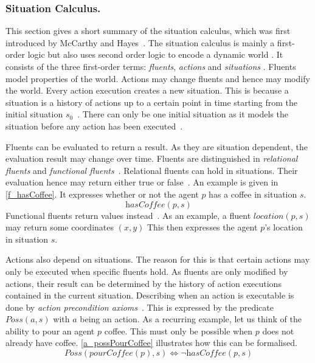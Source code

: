 \subsubsection{Situation Calculus.}\label{fun:apl_sitCalc}
This section gives a short summary of the situation calculus, which was first introduced by McCarthy and Hayes~\cite{mccarthy_philosophical_1969}. The situation calculus is mainly a first-order logic but also uses second order logic to encode a dynamic world \cite{levesque_golog:_1997}. %
It consists of the three first-order terms: \emph{fluents}, \emph{actions} and \emph{situations} \cite{mccarthy_philosophical_1969,boutilier_decision-theoretic_2000}. %
Fluents model properties of the world. Actions may change fluents and hence may modify the world. Every action execution creates a new situation. This is because a situation is a history of actions up to a certain point in time starting from the initial situation $s_0$~\cite{schiffel_reconciling_2006,levesque_golog:_1997}. %
There can only be one initial situation as it models the situation before any action has been executed~\cite{pirri_contributions_1999}. %

Fluents can be evaluated to return a result. As they are situation dependent, the evaluation result may change over time. Fluents are distinguished in \emph{relational fluents} and \emph{functional fluents}~\cite{levesque_golog:_1997}. %
Relational fluents can hold in situations. Their evaluation hence may return either true or false~\cite{boutilier_decision-theoretic_2000}. %
An example is given in \autoref{f_hasCoffee}. It expresses whether or not the agent $p$ has a coffee in situation $s$.
\begin{equation}\label{f_hasCoffee}
  \textit{hasCoffee}(p,s)
\end{equation}
Functional fluents return values instead~\cite{levesque_golog:_1997}. %
As an example, a fluent $\textit{location}(p,s)$ may return some coordinates $(x,y)$ This then expresses the agent $p$'s location in situation $s$.

Actions also depend on situations. The reason for this is that certain actions may only be executed when specific fluents hold. As fluents are only modified by actions, their result can be determined by the history of action executions contained in the current situation. Describing when an action is executable is done by \emph{action precondition axioms}~\cite{lin_state_1994}. %
This is expressed by the predicate $\textit{Poss}(a,s)$ with $a$ being an action. As a recurring example, let us think of the ability to pour an agent $p$ coffee. This must only be possible when $p$ does not already have coffee. \autoref{a_possPourCoffee} illustrates how this can be formalised.
\begin{equation}\label{a_possPourCoffee}
  \textit{Poss}(\textit{pourCoffee}(p),s) \Leftrightarrow \neg \textit{hasCoffee}(p,s)
\end{equation}

